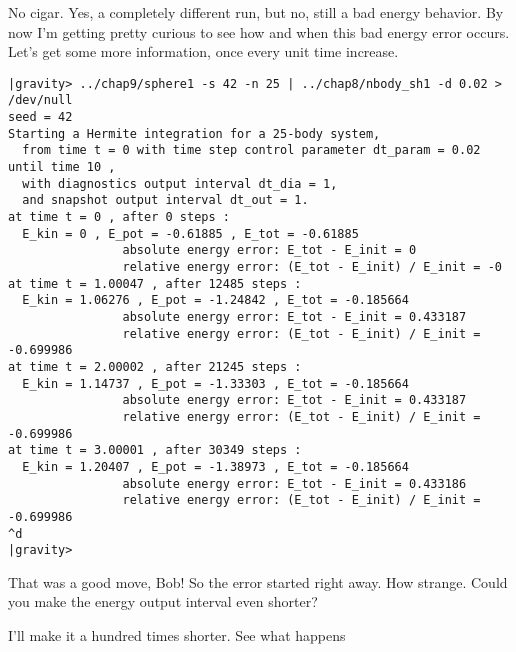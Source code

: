 \abc

\bob
No cigar.  Yes, a completely different run, but no, still a bad energy
behavior.  By now I'm getting pretty curious to see how and when this
bad energy error occurs.  Let's get some more information, once every
unit time increase.

\cba

\begin{small}
\begin{verbatim}
|gravity> ../chap9/sphere1 -s 42 -n 25 | ../chap8/nbody_sh1 -d 0.02 > /dev/null
seed = 42
Starting a Hermite integration for a 25-body system,
  from time t = 0 with time step control parameter dt_param = 0.02  until time 10 ,
  with diagnostics output interval dt_dia = 1,
  and snapshot output interval dt_out = 1.
at time t = 0 , after 0 steps :
  E_kin = 0 , E_pot = -0.61885 , E_tot = -0.61885
                absolute energy error: E_tot - E_init = 0
                relative energy error: (E_tot - E_init) / E_init = -0
at time t = 1.00047 , after 12485 steps :
  E_kin = 1.06276 , E_pot = -1.24842 , E_tot = -0.185664
                absolute energy error: E_tot - E_init = 0.433187
                relative energy error: (E_tot - E_init) / E_init = -0.699986
at time t = 2.00002 , after 21245 steps :
  E_kin = 1.14737 , E_pot = -1.33303 , E_tot = -0.185664
                absolute energy error: E_tot - E_init = 0.433187
                relative energy error: (E_tot - E_init) / E_init = -0.699986
at time t = 3.00001 , after 30349 steps :
  E_kin = 1.20407 , E_pot = -1.38973 , E_tot = -0.185664
                absolute energy error: E_tot - E_init = 0.433186
                relative energy error: (E_tot - E_init) / E_init = -0.699986
^d
|gravity> 
\end{verbatim}
\end{small}

\abc

\carol
That was a good move, Bob!  So the error started right away.  How
strange.  Could you make the energy output interval even shorter?

\bob
I'll make it a hundred times shorter.  See what happens

\cba


